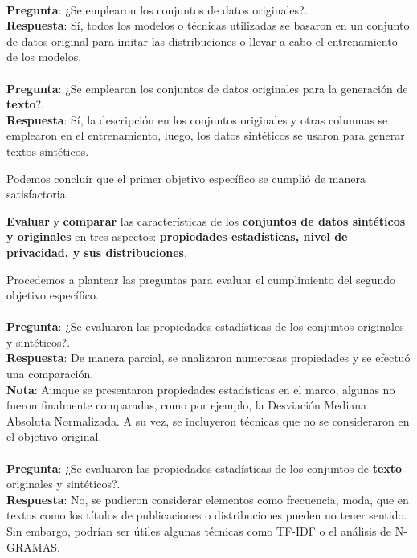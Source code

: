 \\
\textbf{Pregunta}: ¿Se emplearon los conjuntos de datos originales?. \\
\textbf{Respuesta}: Sí, todos los modelos o técnicas utilizadas se basaron en un conjunto de datos original para imitar las distribuciones o llevar a cabo el entrenamiento de los modelos. \textcolor{green}{}
\\
\\
\textbf{Pregunta}: ¿Se emplearon los conjuntos de datos originales para la generación de \textbf{texto}?. \\
\textbf{Respuesta}: Sí, la descripción en los conjuntos originales y otras columnas se emplearon en el entrenamiento, luego, los datos sintéticos se usaron para generar textos sintéticos. \textcolor{green}{}

Podemos concluir que el primer objetivo específico se cumplió de manera satisfactoria. \textcolor{green}{} \textcolor{green}{}
\newpage
\begin{tcolorbox}[colback=white,colframe=black!50!white,title=Objetivo especifico 2: Evaluación y comparación]
\textbf{Evaluar} y \textbf{comparar} las características de los \textbf{conjuntos de datos sintéticos y originales} en tres aspectos: \textbf{propiedades estadísticas, nivel de privacidad, y sus distribuciones}.
\end{tcolorbox}
Procedemos a plantear las preguntas para evaluar el cumplimiento del segundo objetivo específico.
\\
\\
\textbf{Pregunta}: ¿Se evaluaron las propiedades estadísticas de los conjuntos originales y sintéticos?. \\
\textbf{Respuesta}: De manera parcial, se analizaron numerosas propiedades y se efectuó una comparación. \textcolor{orange}{\faExclamationTriangle} \\
\textbf{Nota}: Aunque se presentaron propiedades estadísticas en el marco, algunas no fueron finalmente comparadas, como por ejemplo, la Desviación Mediana Absoluta Normalizada. A su vez, se incluyeron técnicas que no se consideraron en el objetivo original. \textcolor{orange}{\faExclamationTriangle}
\\
\\
\textbf{Pregunta}: ¿Se evaluaron las propiedades estadísticas de los conjuntos de \textbf{texto} originales y sintéticos?. \\
\textbf{Respuesta}: No, se pudieron considerar elementos como frecuencia, moda, que en textos como los títulos de publicaciones o distribuciones pueden no tener sentido. Sin embargo, podrían ser útiles algunas técnicas como TF-IDF o el análisis de N-GRAMAS. \textcolor{red}{} \\
